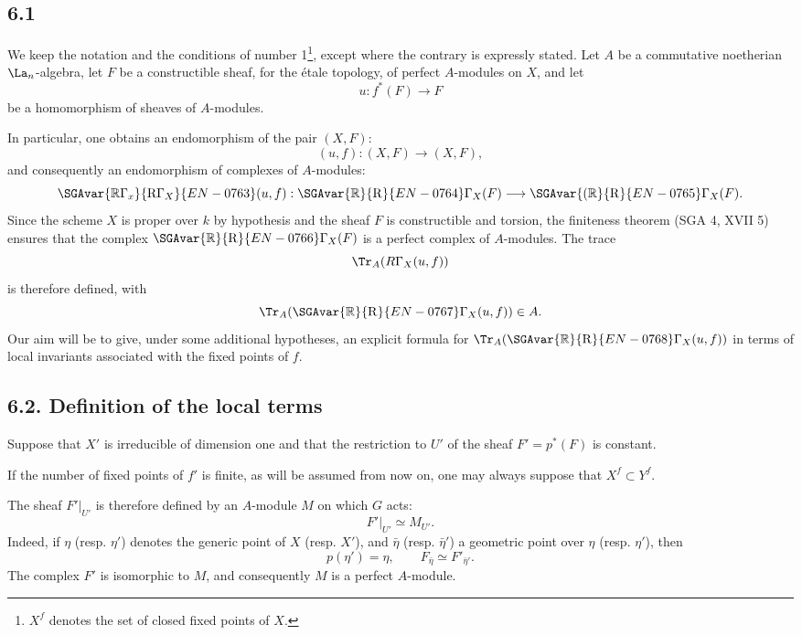 \subsection*{6.1}
We keep the notation and the conditions of number 1\footnote{$X^f$ denotes the set of closed fixed points of $X$.}, except where the contrary is expressly stated. Let $A$ be a commutative noetherian $\La_n$-algebra, let $F$ be a constructible sheaf, for the étale topology, of perfect $A$-modules on $X$, and let
\[
u:f^*(F)\longrightarrow F
\]
be a homomorphism of sheaves of $A$-modules.

In particular, one obtains an endomorphism of the pair $(X,F)$:
\[
(u,f):(X,F)\longrightarrow (X,F),
\]
and consequently an endomorphism of complexes of $A$-modules:
\[
\SGAvar{\mathbb{R}\Gamma_x}{\mathrm{R}\Gamma_X}{EN-0763}(u,f):\SGAvar{\mathbb{R}}{\mathrm{R}}{EN-0764}\Gamma_X(F)\longrightarrow \SGAvar{(\mathbb{R}}{\mathrm{R}}{EN-0765}\Gamma_X(F).
\]
Since the scheme $X$ is proper over $k$ by hypothesis and the sheaf $F$ is constructible and torsion, the finiteness theorem (SGA 4, XVII 5) ensures that the complex $\SGAvar{\mathbb{R}}{\mathrm{R}}{EN-0766}\Gamma_X(F)$ is a perfect complex of $A$-modules. The trace
\[
\Tr_A(R\Gamma_X(u,f))
\]
is therefore defined, with
\[
\Tr_A(\SGAvar{\mathbb{R}}{\mathrm{R}}{EN-0767}\Gamma_X(u,f))\in A.
\]
Our aim will be to give, under some additional hypotheses, an explicit formula for $\Tr_A(\SGAvar{\mathbb{R}}{\mathrm{R}}{EN-0768}\Gamma_X(u,f))$ in terms of local invariants associated with the fixed points of $f$.

\subsection*{6.2. Definition of the local terms}
Suppose that $X'$ is irreducible of dimension one and that the restriction to $U'$ of the sheaf $F'=p^*(F)$ is constant.

If the number of fixed points of $f'$ is finite, as will be assumed from now on, one may always suppose that $X^f\subset Y^f$.

The sheaf $F'|_{U'}$ is therefore defined by an $A$-module $M$ on which $G$ acts:
\[
F'|_{U'}\simeq M_{U'}.
\]
Indeed, if $\eta$ (resp. $\eta'$) denotes the generic point of $X$ (resp. $X'$), and $\bar\eta$ (resp. $\bar\eta'$) a geometric point over $\eta$ (resp. $\eta'$), then
\[
p(\eta')=\eta,\qquad F_{\bar\eta}\simeq F'_{\bar\eta'}.
\]
The complex $F'$ is isomorphic to $M$, and consequently $M$ is a perfect $A$-module.

